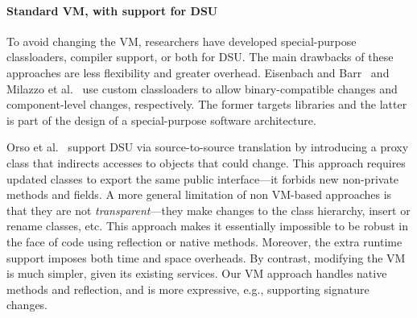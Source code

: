 \paragraph{Standard VM, with support for DSU}
To avoid changing the VM, researchers have developed special-purpose
classloaders, compiler support, or both for DSU.  The main drawbacks
of these approaches are less flexibility and greater
overhead.  Eisenbach and Barr~\cite{BarrE03} and Milazzo et
al.~\cite{Milazzo05updates} use custom classloaders to allow
binary-compatible changes and component-level changes, respectively.
The former targets libraries and the latter is part of the design of a
special-purpose software architecture.



Orso et al.~\cite{orso:java} support DSU via source-to-source translation
by introducing a proxy class that indirects accesses
to objects that could change.  
This approach requires updated classes to export the same public
interface---it forbids new non-private methods and fields. %
A more general limitation of non VM-based approaches
is that they are not \emph{transparent}---they make changes to the
class hierarchy, insert or rename classes, etc.  This approach makes
it essentially impossible to be robust in the face of code using
reflection or native methods.  Moreover, the extra runtime support
imposes both time and space overheads.  By contrast, modifying the VM
is much simpler, given its existing services.  Our VM approach handles
native methods and reflection,
and is more expressive, e.g., supporting signature changes.

